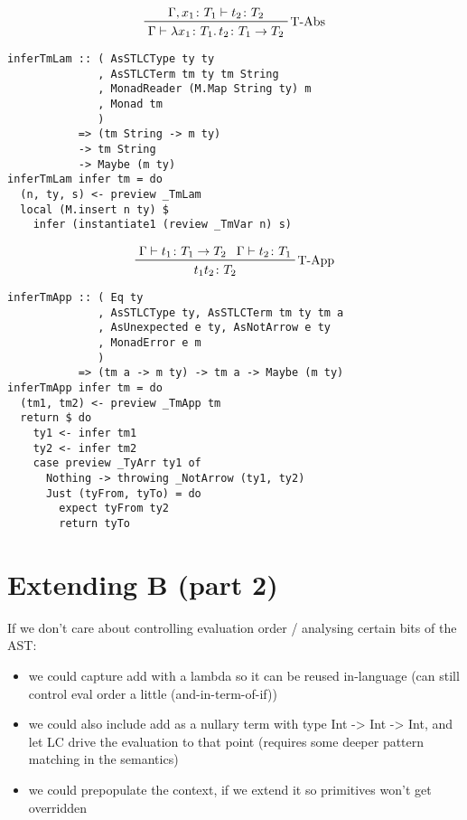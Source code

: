 \documentclass{beamer}
\begin{document}
\begin{frame}[fragile]
\begin{frame}[fragile]
  \begin{displaymath}  
    \prftree[r]{T-Abs}
    {\Gamma, x_1 \colon T_1 \vdash t_2 \colon T_2}
    {\Gamma \vdash \lambda x_1 \colon T_1 \ldotp t_2 \colon T_1 \rightarrow T_2}
  \end{displaymath}  
  \begin{verbatim}
inferTmLam :: ( AsSTLCType ty ty
              , AsSTLCTerm tm ty tm String
              , MonadReader (M.Map String ty) m
              , Monad tm
              )
           => (tm String -> m ty)
           -> tm String
           -> Maybe (m ty)
inferTmLam infer tm = do
  (n, ty, s) <- preview _TmLam
  local (M.insert n ty) $
    infer (instantiate1 (review _TmVar n) s)
  \end{verbatim}  
\end{frame}

\begin{frame}[fragile]
  \begin{displaymath}  
    \prftree[r]{T-App}
    {\Gamma \vdash t_1 \colon T_1 \rightarrow T_2}
    {\Gamma \vdash t_2 \colon T_1}
    {t_1 t_2 \colon T_2}
  \end{displaymath}  
  \begin{verbatim}
inferTmApp :: ( Eq ty
              , AsSTLCType ty, AsSTLCTerm tm ty tm a
              , AsUnexpected e ty, AsNotArrow e ty
              , MonadError e m
              )
           => (tm a -> m ty) -> tm a -> Maybe (m ty)
inferTmApp infer tm = do
  (tm1, tm2) <- preview _TmApp tm
  return $ do
    ty1 <- infer tm1
    ty2 <- infer tm2
    case preview _TyArr ty1 of
      Nothing -> throwing _NotArrow (ty1, ty2)
      Just (tyFrom, tyTo) = do
        expect tyFrom ty2
        return tyTo
  \end{verbatim}  
\end{frame}

\section{Extending B (part 2)}

\begin{frame}[c]
If we don't care about controlling evaluation order / analysing certain bits of
the AST:
\begin{itemize}
\item we could capture add with a lambda so it can be reused in-language (can
  still control eval order a little (and-in-term-of-if))
\item we could also include add as a nullary term with type Int -> Int -> Int, and let LC drive the
  evaluation to that point (requires some deeper pattern matching in the semantics)
\item we could prepopulate the context, if we extend it so primitives won't get overridden
\end{itemize}
\end{frame}


\end{frame}
\end{document}
